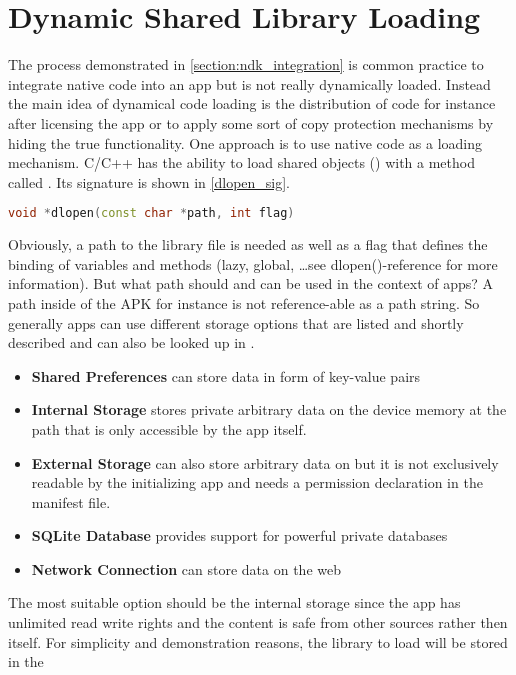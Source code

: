 \section{Dynamic Shared Library Loading}\label{section:shared_library_loading}
The process demonstrated in \autoref{section:ndk_integration} is common practice to 
integrate native code into an app but is not really dynamically loaded. Instead
the main idea of dynamical code loading is the distribution of code for instance
after licensing the app or to apply some sort of copy protection mechanisms by hiding
the true functionality. One approach is to use native code as a loading mechanism.
C/C++ has the ability to load shared objects () with a method called
. Its signature is shown in \autoref{dlopen_sig}.
\begin{lstlisting}[language=C++, caption=dlopen() Signature, label=dlopen_sig]
void *dlopen(const char *path, int flag)
\end{lstlisting}
Obviously, a path to the library file is needed as well as a flag that defines the binding of variables and methods (lazy, global, \ldots see dlopen()-reference for more information).
But what path should and can be used in the context of apps? A path inside of the APK
for instance is not reference-able as a path string. So generally apps can use different storage options that are listed and shortly described and can also be looked up in
\parencite{storage_options}.
\begin{itemize}
\item \textbf{Shared Preferences} can store data in form of key-value pairs
\item \textbf{Internal Storage} stores private arbitrary data on the device memory at the path
  that is only accessible by the app itself.
\item \textbf{External Storage} can also store arbitrary data on  but it is not exclusively readable by the initializing app and needs a permission declaration in
the manifest file.
\item \textbf{SQLite Database} provides support for powerful private databases
\item \textbf{Network Connection} can store data on the web 
\end{itemize}
The most suitable option should be the internal storage since the app has unlimited read
write rights and the content is safe from other sources rather then itself. For simplicity and demonstration reasons, the library to load will be stored in the
